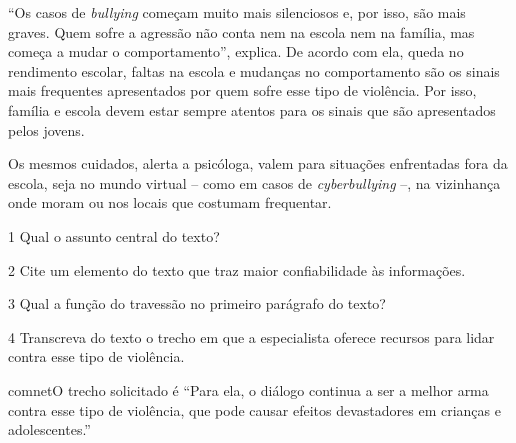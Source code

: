 \begin{myquote}
``Os casos de \textit{bullying} começam muito mais silenciosos e, por isso, são
mais graves. Quem sofre a agressão não conta nem na escola nem na
família, mas começa a mudar o comportamento'', explica. De acordo com
ela, queda no rendimento escolar, faltas na escola e mudanças no
comportamento são os sinais mais frequentes apresentados por quem sofre
esse tipo de violência. Por isso, família e escola devem estar sempre
atentos para os sinais que são apresentados pelos jovens.

Os mesmos cuidados, alerta a psicóloga, valem para situações enfrentadas
fora da escola, seja no mundo virtual -- como em casos de \textit{cyberbullying}
--, na vizinhança onde moram ou nos locais que costumam frequentar.


\end{myquote}

\num{1} Qual o assunto central do texto?


\num{2} Cite um elemento do texto que traz maior confiabilidade às informações.


\num{3} Qual a função do travessão no primeiro parágrafo do texto?


\num{4} Transcreva do texto o trecho em que a especialista oferece recursos
para lidar contra esse tipo de violência. 

comnet{O trecho solicitado é ``Para ela, o diálogo continua a ser a melhor
arma contra esse tipo de violência, que pode causar efeitos devastadores em
crianças e adolescentes.''}


